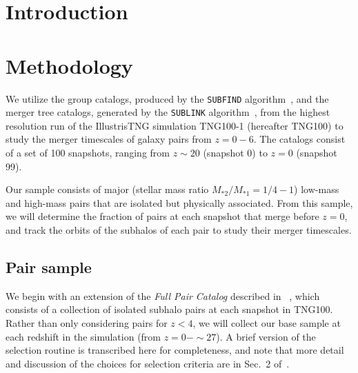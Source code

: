 \documentclass[twocolumn,linenumbers]{aastex631}
\newcommand{\paircat}{\textit{Full Pair Catalog}}
\begin{document}
\section{Introduction} \label{sec:intro}




\section{Methodology} \label{sec:methods}
We utilize the group catalogs, produced by the \texttt{SUBFIND} algorithm~\citep{Springel2001,Dolag2009}, and the merger tree catalogs, generated by the \texttt{SUBLINK} algorithm~\citep{RG2015}, from the highest resolution run of the IllustrisTNG simulation TNG100-1 (hereafter TNG100) to study the merger timescales of galaxy pairs from $z=0-6$.
The catalogs consist of a set of 100 snapshots, ranging from $z\sim20$ (snapshot 0) to $z=0$ (snapshot 99).

Our sample consists of major (stellar mass ratio $M_{*2}/M_{*1}= 1/4 - 1$) low-mass and high-mass pairs that are isolated but physically associated.
From this sample, we will determine the fraction of pairs at each snapshot that merge before $z=0$, and track the orbits of the subhalos of each pair to study their merger timescales.

\subsection{Pair sample}
We begin with an extension of the \paircat{} described in ~\citet{Chamberlain2024}, which consists of a collection of isolated subhalo pairs at each snapshot in TNG100. 
Rather than only considering pairs for $z<4$, we will collect our base sample at each redshift in the simulation (from $z=0-\sim 27$). 
A brief version of the selection routine is transcribed here for completeness, and note that more detail and discussion of the choices for selection criteria are in Sec.~2 of~\citet{Chamberlain2024}. 
\end{document}
